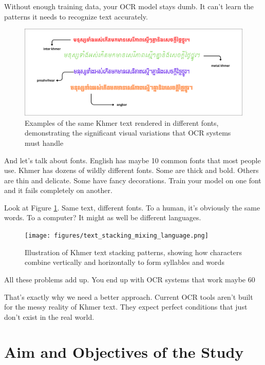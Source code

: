 Without enough training data, your OCR model stays dumb. It can't learn the patterns it needs to recognize text accurately.

\begin{figure}[H]
    \centering
    \includegraphics[width=\textwidth]{figures/varianty_of_font.png}
    \caption{Examples of the same Khmer text rendered in different fonts, demonstrating the significant visual variations that OCR systems must handle}
    \label{fig:font_variants}
\end{figure}

And let's talk about fonts. English has maybe 10 common fonts that most people use. Khmer has dozens of wildly different fonts. Some are thick and bold. Others are thin and delicate. Some have fancy decorations. Train your model on one font and it fails completely on another.

Look at Figure \ref{fig:font_variants}. Same text, different fonts. To a human, it's obviously the same words. To a computer? It might as well be different languages.

\begin{figure}[H]
    \centering
    \texttt{[image: figures/text\_stacking\_mixing\_language.png]}
    \caption{Illustration of Khmer text stacking patterns, 
    showing how characters combine vertically and horizontally 
    to form syllables and words \citep{buoy2023khmerocr}}
    \label{fig:text_stacking}
\end{figure}

All these problems add up. You end up with OCR systems that work maybe 60%

That's exactly why we need a better approach. Current OCR tools aren't built for the messy reality of Khmer text. They expect perfect conditions that just don't exist in the real world.

\section{Aim and Objectives of the Study}
\label{sec:objectives}

